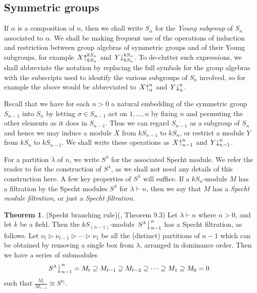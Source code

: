 \documentclass[10pt]{article}
\theoremstyle{definition}
\newtheorem{theo}[theorem]{Theorem}
\begin{document}
\subsection{Symmetric groups}
If $\alpha$ is a composition of $n$, then we shall write $S_\alpha$ for the \textit{Young subgroup} of $S_n$ associated to $\alpha$.
We shall be making frequent use of the operations of induction and restriction between group algebras of symmetric groups and of their
Young subgroups, for example
$\left.X\right\uparrow^{kS_n}_{kS_\alpha}$ and $\left.Y\right\downarrow^{kS_n}_{kS_\alpha}$.
To de-clutter such expressions, we shall abbreviate the notation by replacing the full symbols for the group algebras with the subscripts
used to identify the various subgroups of $S_n$ involved, so for example the above would be abbreviated to
$\left.X\right\uparrow^{n}_{\alpha}$ and $\left.Y\right\downarrow^{n}_{\alpha}$.

Recall that we have for each $n > 0$ a natural embedding of the symmetric group $S_{n-1}$ into $S_n$ by letting
$\sigma \in S_{n-1}$ act on ${1,\ldots,n}$ by fixing $n$ and permuting the other elements as it does in $S_{n-1}$. Thus we can regard
$S_{n-1}$ as a subgroup of $S_n$ and hence we may induce a module $X$ from $kS_{n-1}$ to $kS_n$, or restrict a module $Y$ from $kS_n$ to
$kS_{n-1}$. We shall write these operations as
$\left.X\right\uparrow^{n}_{n-1}$  and $\left.Y\right\downarrow^{n}_{n-1}$.

For a partition $\lambda$ of $n$, we write $S^\lambda$ for the associated Specht module. We refer the reader to \cite[Ch. 4]{JAMSN} for
the construction of $S^\lambda$, as we shall not need any details of this construction here. A few key properties of $S^\lambda$ will
suffice. If a $kS_n$-module $M$ has a filtration by the Specht modules $S^\lambda$ for $\lambda \vdash n$, then we say that $M$ has a
\textit{Specht module filtration}, or just a \textit{Specht filtration}.

\begin{theo}\textup{(}Specht branching rule\textup{)}\label{jam_branch_rule_sn:thm}
(\cite{JAMSN}, Theorem 9.3) Let $\lambda \vdash n$ where $n > 0$, and let $k$ be a field. Then the $kS_{(n-1)}$-module
$\left.S^\lambda\right\downarrow^n_{n-1}$ has a Specht filtration, as follows. Let
$\nu_t \triangleright \nu_{t-1} \triangleright \cdots \triangleright \nu_1$ be all the (distinct) partitions of $n-1$ which can be
obtained by removing a single box from $\lambda$, arranged in dominance order. Then we have a series of submodules
\[ \left.S^\lambda\right\downarrow^n_{n-1}  = M_t \supseteq M_{t-1} \supseteq M_{t-2} \supseteq \cdots \supseteq M_1 \supseteq M_0 = 0 \]
such that $\frac{M_l}{M_{l-1}} \cong S^{\nu_l}$.
\end{theo}
\end{document}
